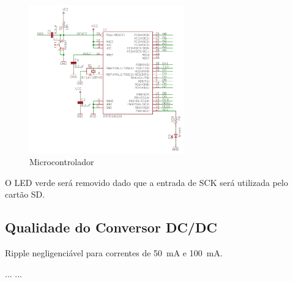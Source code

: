 \documentclass{article}
\begin{document}
\begin{figure}[htb!]
\centering
\includegraphics[width=0.6\textwidth]{Figuras/Fig24.png}
\caption{Microcontrolador}
\label{fig:fig15}
\end{figure}

O LED verde será removido dado que a entrada de SCK será utilizada pelo cartão SD.

\subsection{Qualidade do Conversor DC/DC}

Ripple negligenciável para correntes de 50~mA e 100~mA. 

\begin{thebibliography}{99}
 ...
 ...
\end{thebibliography}
\end{document}
